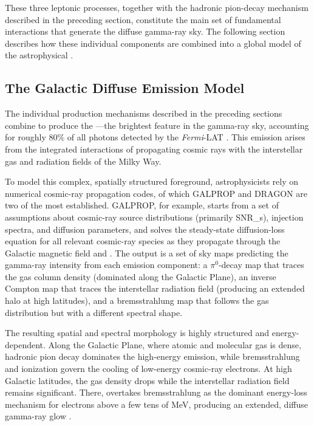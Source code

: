 These three leptonic processes, together with the hadronic pion-decay mechanism described in the preceding section, constitute the main set of fundamental interactions that generate the diffuse gamma-ray sky.
The following section describes how these individual components are combined into a global model of the astrophysical \GDE.

\subsection{The Galactic Diffuse Emission Model}
\label{sec:gde_model}

The individual production mechanisms described in the preceding sections combine to produce the \GDE---the brightest feature in the gamma-ray sky, accounting for roughly 80\% of all photons detected by the \textit{Fermi}-LAT \cite{Fermi-LAT:2014ryh,DGRB-review}.
This emission arises from the integrated interactions of propagating cosmic rays with the interstellar gas and radiation fields of the Milky Way.

To model this complex, spatially structured foreground, astrophysicists rely on numerical cosmic-ray propagation codes, of which GALPROP \cite{Strong:2007nh} and DRAGON \cite{Evoli:2016xgn} are two of the most established.
GALPROP, for example, starts from a set of assumptions about cosmic-ray source distributions (primarily \glspl{SNR_}), injection spectra, and diffusion parameters, and solves the steady-state diffusion-loss equation for all relevant cosmic-ray species as they propagate through the Galactic magnetic field and \ISM.
The output is a set of sky maps predicting the gamma-ray intensity from each emission component: a $\pi^0$-decay map that traces the gas column density (dominated along the Galactic Plane), an inverse Compton map that traces the interstellar radiation field (producing an extended halo at high latitudes), and a bremsstrahlung map that follows the gas distribution but with a different spectral shape.

The resulting spatial and spectral morphology is highly structured and energy-dependent.
Along the Galactic Plane, where atomic and molecular gas is dense, hadronic pion decay dominates the high-energy emission, while bremsstrahlung and ionization govern the cooling of low-energy cosmic-ray electrons.
At high Galactic latitudes, the gas density drops while the interstellar radiation field remains significant.
There, \ICS overtakes bremsstrahlung as the dominant energy-loss mechanism for electrons above a few tens of MeV, producing an extended, diffuse gamma-ray glow \cite{Pinetti:2021jjs}.

